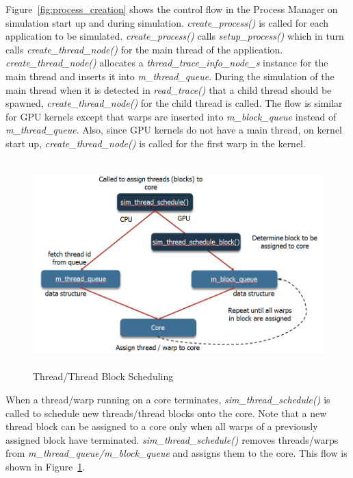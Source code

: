 Figure~\ref{fig:process_creation} shows the control flow in the Process Manager on
simulation start up and during simulation. \textit{create\_process()} is called
for each application to be simulated. \textit{create\_process()} calls
\textit{setup\_process()} which in turn calls \textit{create\_thread\_node()}
for the main thread of the application. \textit{create\_thread\_node()}
allocates a \textit{thread\_trace\_info\_node\_s} instance for the main thread
and inserts it into \textit{m\_thread\_queue}. During the simulation of the
main thread when it is detected in \textit{read\_trace()} that a child thread
should be spawned, \textit{create\_thread\_node()} for the child thread is
called. The flow is similar for GPU kernels except that warps are inserted into
\textit{m\_block\_queue} instead of \textit{m\_thread\_queue}. Also, since GPU
kernels do not have a main thread, on kernel start up,
\textit{create\_thread\_node()} is called for the first warp in the
kernel. 

\begin{figure}[htb]
\centering
\includegraphics[height=80mm]{figs/thread_scheduling}
\caption{Thread/Thread Block Scheduling}
\label{fig:thread_scheduling}
\end{figure}

When a thread/warp running on a core terminates,
\textit{sim\_thread\_schedule()} is called to schedule new threads/thread
blocks onto the core. Note that a new thread block can be assigned to a
core only when all warps of a previously assigned block have terminated.
\textit{sim\_thread\_schedule()} removes threads/warps from
\textit{m\_thread\_queue/m\_block\_queue} and assigns them to the core.
This flow is shown in Figure~\ref{fig:thread_scheduling}.


